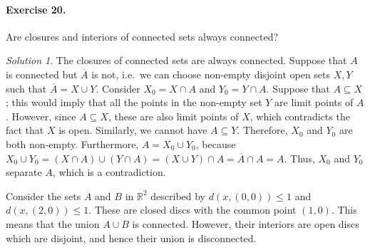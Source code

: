 \documentclass[11pt]{report}
\def\R{\mathbb{R}}
\theoremstyle{remark}
\newtheorem*{solution}{Solution}
\begin{document}
    \paragraph{Exercise 20.} Are closures and interiors of connected sets always
    connected?
    \begin{solution}
        The closures of connected sets are always connected. Suppose that $A$ is
        connected but $\overline{A}$ is not, i.e.\ we can choose non-empty disjoint
        open sets $X, Y$ such that $\overline{A} = X \cup Y$. Consider $X_0 = X \cap
        A$ and $Y_0 = Y \cap A$. Suppose that $A \subseteq X$; this would imply that
        all the points in the non-empty set $Y$ are limit points of $A$. However,
        since $A \subseteq X$, these are also limit points of $X$, which contradicts
        the fact that $X$ is open. Similarly, we cannot have $A \subseteq Y$.
        Therefore, $X_0$ and $Y_0$ are both non-empty. Furthermore, $A = X_0 \cup
        Y_0$, because $X_0 \cup Y_0 = (X \cap A) \cup (Y \cap A) = (X \cup Y) \cap A
        = \overline{A} \cap A = A$. Thus, $X_0$ and $Y_0$ separate $A$, which is a
        contradiction.

        Consider the sets $A$ and $B$ in $\R^2$ described by $d(x, (0, 0)) \leq
        1$ and $d(x, (2, 0)) \leq 1$. These are closed discs with the common point
        $(1, 0)$. This means that the union $A \cup B$ is connected. However, their
        interiors are open discs which are disjoint, and hence their union is
        disconnected.
    \end{solution}
\end{document}
